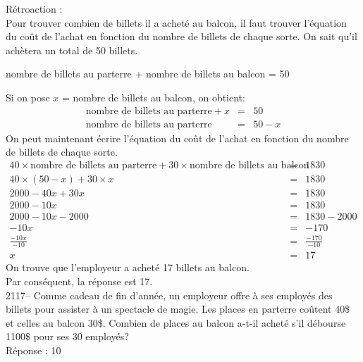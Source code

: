 \documentclass[letterpaper, 12pt]{article}
\begin{document}
R\'etroaction :\\
Pour trouver combien de billets il a achet\'e au balcon, il faut trouver l'\'equation du co\^ut de l'achat en fonction du nombre de billets de chaque sorte. On sait qu'il ach\`etera un total de 50 billets.
\begin{center}
 nombre de billets au parterre + nombre de billets au balcon = 50
\end{center}
Si on pose $x$ = nombre de billets au balcon, on obtient:
\begin{eqnarray*}
 \textrm{nombre de billets au parterre} + x &=& 50\\
 \textrm{nombre de billets au parterre} &=& 50 - x
\end{eqnarray*}
On peut maintenant \'ecrire l'\'equation du co\^ut de l'achat en fonction du nombre de billets de chaque sorte.
\begin{eqnarray*}
 40 \times \textrm{nombre de billets au parterre} + 30 \times \textrm{nombre de billets au balcon} &=& 1830\\
 40 \times (50-x) + 30 \times x &=& 1830\\
2000 - 40x + 30x &=& 1830\\
2000 - 10x &=& 1830\\
2000 - 10x -2000&=& 1830-2000\\
-10x&=& -170\\[2mm]
\frac{-10x}{-10}&=&\frac{-170}{-10}\\[2mm]
x&=& 17
\end{eqnarray*}
On trouve que l'employeur a achet\'e 17 billets au balcon.\\
Par cons\'equent, la r\'eponse est 17.\\

2117--  Comme cadeau de fin d'ann\'ee, un employeur offre \`a ses employ\'es des billets pour assister \`a un spectacle de magie. Les places en parterre co\^utent 40\$ et celles au balcon 30\$. Combien de places au balcon a-t-il achet\'e s'il d\'ebourse 1100\$ pour ses 30 employ\'es?\\

R\'eponse : 10\\
\end{document}
